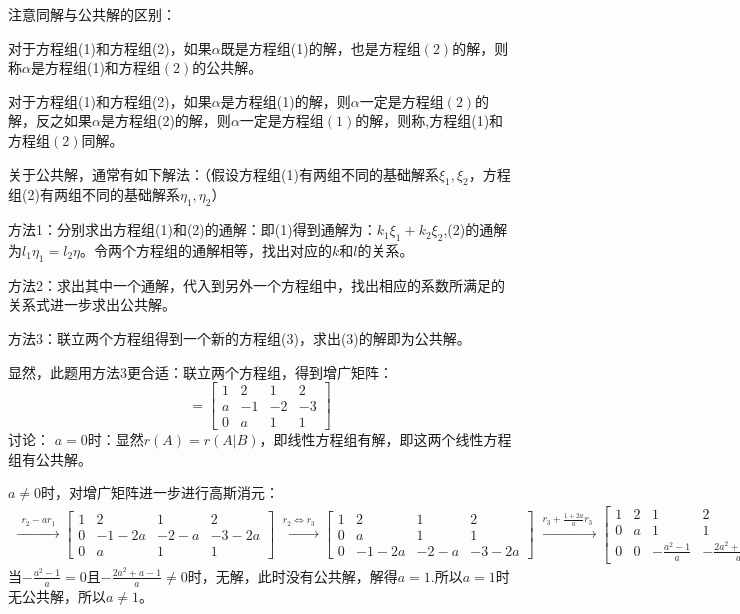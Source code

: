 \documentclass{article}
\begin{document}
\begin{jie}
\textcolor[rgb]{1.00,0.00,0.00}{注意同解与公共解的区别：}

\textcolor[rgb]{1.00,0.00,0.00}{对于方程组(1)和方程组(2)，如果$\alpha$既是方程组(1)的解，也是方程组$(2)$的解，则称$\alpha$是方程组(1)和方程组$(2)$的公共解。}

\textcolor[rgb]{1.00,0.00,0.00}{对于方程组(1)和方程组(2)，如果$\alpha$是方程组(1)的解，则$\alpha$一定是方程组$(2)$的解，反之如果$\alpha$是方程组(2)的解，则$\alpha$一定是方程组$(1)$的解，则称,方程组(1)和方程组$(2)$同解。}

 关于公共解，通常有如下解法：（假设方程组(1)有两组不同的基础解系$\xi_1,\xi_2$，方程组(2)有两组不同的基础解系$\eta_1,\eta_2$）

 方法1：分别求出方程组(1)和(2)的通解：即(1)得到通解为：$k_1\xi_1+k_2\xi_2$,(2)的通解为$l_1\eta_1=l_2\eta$。令两个方程组的通解相等，找出对应的$k$和$l$的关系。

 方法2：求出其中一个通解，代入到另外一个方程组中，找出相应的系数所满足的关系式进一步求出公共解。

 方法3：联立两个方程组得到一个新的方程组(3)，求出(3)的解即为公共解。

 显然，此题用方法3更合适：联立两个方程组，得到增广矩阵：
 \begin{equation*}[A|B]=
\begin{bmatrix}
  1 & 2 & 1 & 2 \\
  a & -1 & -2 &-3\\
  0 & a & 1 &1
\end{bmatrix}
 \end{equation*}
 讨论：
 $a=0$时：显然$r(A)=r(A|B)$，即线性方程组有解，即这两个线性方程组有公共解。

 $a\neq 0$时，对增广矩阵进一步进行高斯消元：
 \begin{align*}
\xrightarrow{\substack{r_{2}-a r_{1}}}
{
\begin{bmatrix}
  1 & 2 & 1 & 2 \\
  0 & -1-2a & -2-a &-3-2a\\
  0 & a & 1 &1
\end{bmatrix}
}\xrightarrow{\substack{r_{2}\Leftrightarrow r_{3}}}
{
\begin{bmatrix}
  1 & 2 & 1 & 2 \\
  0 & a & 1 &1\\
    0 & -1-2a & -2-a &-3-2a
\end{bmatrix}
}\xrightarrow{\substack{r_{3}+\frac{1+2a}{a} r_{3}}}
{
\begin{bmatrix}
  1 & 2 & 1 & 2 \\
  0 & a & 1 &1\\
    0 & 0 & -\frac{a^2-1}{a} &-\frac{2a^2+a-1}{a}
\end{bmatrix}
}
 \end{align*}
 当$-\frac{a^2-1}{a}=0$且$-\frac{2a^2+a-1}{a}\neq0$时，无解，此时没有公共解，解得$a=1$.所以$a=1$时无公共解，所以$a\neq1$。
\end{jie}
\end{document}
